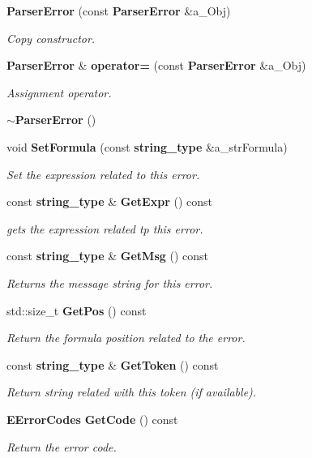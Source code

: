 \begin{CompactItemize}
{\bf ParserError} (const {\bf ParserError} \&a\_\-Obj)
\begin{CompactList}\small\item\em Copy constructor. \item\end{CompactList}\item 
{\bf ParserError} \& {\bf operator=} (const {\bf ParserError} \&a\_\-Obj)
\begin{CompactList}\small\item\em Assignment operator. \item\end{CompactList}\item 
{\bf $\sim$ParserError} ()
\item 
void {\bf SetFormula} (const {\bf string\_\-type} \&a\_\-strFormula)
\begin{CompactList}\small\item\em Set the expression related to this error. \item\end{CompactList}\item 
const {\bf string\_\-type} \& {\bf GetExpr} () const 
\begin{CompactList}\small\item\em gets the expression related tp this error. \item\end{CompactList}\item 
const {\bf string\_\-type} \& {\bf GetMsg} () const 
\begin{CompactList}\small\item\em Returns the message string for this error. \item\end{CompactList}\item 
std::size\_\-t {\bf GetPos} () const 
\begin{CompactList}\small\item\em Return the formula position related to the error. \item\end{CompactList}\item 
const {\bf string\_\-type} \& {\bf GetToken} () const 
\begin{CompactList}\small\item\em Return string related with this token (if available). \item\end{CompactList}\item 
{\bf EErrorCodes} {\bf GetCode} () const 
\begin{CompactList}\small\item\em Return the error code. \item\end{CompactList}\end{CompactItemize}


